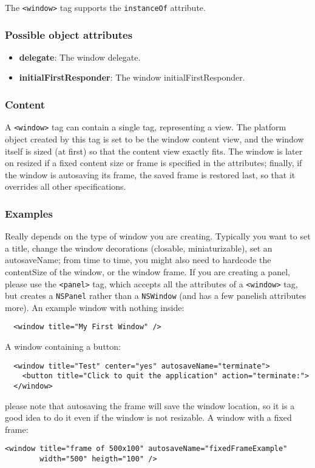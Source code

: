 The \texttt{<window>} tag supports the \texttt{instanceOf} attribute.

\subsubsection{Possible object attributes}
\begin{itemize}
\item {\bf delegate}: The window delegate.
\item {\bf initialFirstResponder}: The window initialFirstResponder.
\end{itemize}

\subsubsection{Content}
A \texttt{<window>} tag can contain a single tag, representing a view.
The platform object created by this tag is set to be the window
content view, and the window itself is sized (at first) so that the
content view exactly fits.  The window is later on resized if a fixed
content size or frame is specified in the attributes; finally, if the
window is autosaving its frame, the saved frame is restored last, so
that it overrides all other specifications.

\subsubsection{Examples}
Really depends on the type of window you are creating.  Typically you
want to set a title, change the window decorations (closable,
miniaturizable), set an autosaveName; from time to time, you might
also need to hardcode the contentSize of the window, or the window
frame.  If you are creating a panel, please use the \texttt{<panel>}
tag, which accepts all the attributes of a \texttt{<window>} tag, but
creates a \texttt{NSPanel} rather than a \texttt{NSWindow} (and has a
few panelish attributes more).  An example window with nothing inside:
\begin{verbatim}
  <window title="My First Window" />
\end{verbatim}
A window containing a button:
\begin{verbatim}
  <window title="Test" center="yes" autosaveName="terminate">
    <button title="Click to quit the application" action="terminate:">
  </window>
\end{verbatim}
please note that autosaving the frame will save the window location,
so it is a good idea to do it even if the window is not resizable.  A
window with a fixed frame:
\begin{verbatim}
<window title="frame of 500x100" autosaveName="fixedFrameExample"
        width="500" heigth="100" />
\end{verbatim}

